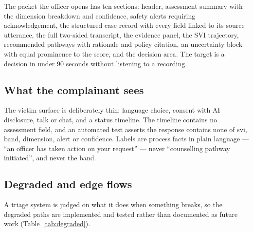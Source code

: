 \documentclass[11pt,a4paper]{article}
\newcommand{\codeus}{\textunderscore\allowbreak}
\DeclareRobustCommand{\code}[1]{{\ttfamily\let\_\codeus #1}}
\begin{document}
The packet the officer opens has ten sections: header, assessment summary with the dimension
breakdown and confidence, safety alerts requiring acknowledgement, the structured case record with
every field linked to its source utterance, the full two-sided transcript, the evidence panel, the
SVI trajectory, recommended pathways with rationale and policy citation, an uncertainty block with
equal prominence to the score, and the decision area. The target is a decision in under 90 seconds
without listening to a recording.

\subsection{What the complainant sees}
\label{sec:timeline}
The victim surface is deliberately thin: language choice, consent with AI disclosure, talk or chat,
and a status timeline. The timeline contains no assessment field, and an automated test asserts the
response contains none of \code{svi}, \code{band}, \code{dimension}, \code{alert} or
\code{confidence}. Labels are process facts in plain language --- ``an officer has taken action on
your request'' --- never ``counselling pathway initiated'', and never the band.

\subsection{Degraded and edge flows}
A triage system is judged on what it does when something breaks, so the degraded paths are
implemented and tested rather than documented as future work (Table~\ref{tab:degraded}).
\end{document}
